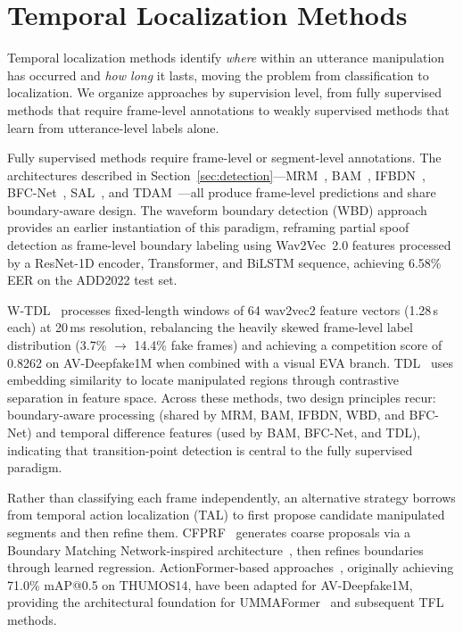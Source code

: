 \documentclass[journal]{IEEEtran}
\begin{document}
\section{Temporal Localization Methods}
\label{sec:localization}

Temporal localization methods identify \emph{where} within an utterance manipulation has occurred and \emph{how long} it lasts, moving the problem from classification to localization. We organize approaches by supervision level, from fully supervised methods that require frame-level annotations to weakly supervised methods that learn from utterance-level labels alone.

Fully supervised methods require frame-level or segment-level annotations. The architectures described in Section~\ref{sec:detection}---MRM~\cite{zhang2023partialspoof}, BAM~\cite{zhong2024bam}, IFBDN~\cite{cai2024ifbdn}, BFC-Net~\cite{zhou2025bfcnet}, SAL~\cite{sal2026}, and TDAM~\cite{li2025tdam}---all produce frame-level predictions and share boundary-aware design. The waveform boundary detection (WBD) approach~\cite{cai2023wbd} provides an earlier instantiation of this paradigm, reframing partial spoof detection as frame-level boundary labeling using Wav2Vec~2.0 features processed by a ResNet-1D encoder, Transformer, and BiLSTM sequence, achieving 6.58\% EER on the ADD2022 test set.

W-TDL~\cite{dragar2024wtdl} processes fixed-length windows of 64 wav2vec2 feature vectors (1.28\,s each) at 20\,ms resolution, rebalancing the heavily skewed frame-level label distribution (3.7\% $\rightarrow$ 14.4\% fake frames) and achieving a competition score of 0.8262 on AV-Deepfake1M when combined with a visual EVA branch. TDL~\cite{xie2024tdl} uses embedding similarity to locate manipulated regions through contrastive separation in feature space. Across these methods, two design principles recur: boundary-aware processing (shared by MRM, BAM, IFBDN, WBD, and BFC-Net) and temporal difference features (used by BAM, BFC-Net, and TDL), indicating that transition-point detection is central to the fully supervised paradigm.

Rather than classifying each frame independently, an alternative strategy borrows from temporal action localization (TAL) to first propose candidate manipulated segments and then refine them. CFPRF~\cite{wu2024cfprf} generates coarse proposals via a Boundary Matching Network-inspired architecture~\cite{lin2019bmn}, then refines boundaries through learned regression. ActionFormer-based approaches~\cite{zhang2022actionformer}, originally achieving 71.0\% mAP@0.5 on THUMOS14, have been adapted for AV-Deepfake1M, providing the architectural foundation for UMMAFormer~\cite{zhang2023ummaformer} and subsequent TFL methods.
\end{document}
